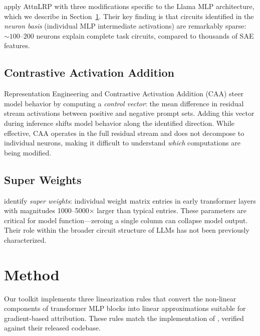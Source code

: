 \documentclass[11pt]{article}
\begin{document}
\citet{arora2025circuits} apply AttnLRP with three modifications specific to the Llama MLP architecture, which we describe in Section~\ref{sec:method}.
Their key finding is that circuits identified in the \emph{neuron basis} (individual MLP intermediate activations) are remarkably sparse: ${\sim}100$--$200$ neurons explain complete task circuits, compared to thousands of SAE features.


\subsection{Contrastive Activation Addition}

Representation Engineering \citep{zou2023representation} and Contrastive Activation Addition (CAA) \citep{rimsky2024steering} steer model behavior by computing a \emph{control vector}: the mean difference in residual stream activations between positive and negative prompt sets.
Adding this vector during inference shifts model behavior along the identified direction.
While effective, CAA operates in the full residual stream and does not decompose to individual neurons, making it difficult to understand \emph{which} computations are being modified.

\subsection{Super Weights}

\citet{yu2024superweights} identify \emph{super weights}: individual weight matrix entries in early transformer layers with magnitudes 1000--5000$\times$ larger than typical entries.
These parameters are critical for model function---zeroing a single column can collapse model output.
Their role within the broader circuit structure of LLMs has not been previously characterized.


\section{Method}
\label{sec:method}

Our toolkit implements three linearization rules that convert the non-linear components of transformer MLP blocks into linear approximations suitable for gradient-based attribution.
These rules match the implementation of \citet{arora2025circuits}, verified against their released codebase.
\end{document}
